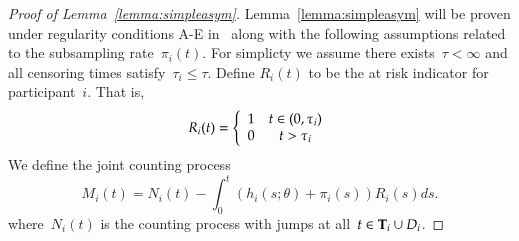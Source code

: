 \documentclass[11pt]{amsart}
\def\bfT{{\bf T}}
\begin{document}
\begin{proof}[Proof of Lemma~\ref{lemma:simpleasym}]
Lemma~\ref{lemma:simpleasym} will be proven under regularity
conditions A-E in~\cite[pp. 420--421]{Andersen1993} along with the
following assumptions related to the subsampling rate~$\pi_i (t)$.
For simplicty we assume there exists~$\tau < \infty$ and all censoring
times satisfy~$\tau_i \leq \tau$. Define $R_i (t)$ to be the at risk
indicator for participant~$i$.  That is, 
\[
R_i (t) = \left \{ \begin{array}{c c} 1 & t \in (0,\tau_i) \\ 0
                                        & t > \tau_i\end{array} \right .
\]
We define the joint counting process
\[
M_i (t) = N_i (t) - \int_0^t (h_i (s; \theta) + \pi_i (s)) R_i (s) ds. 
\]
where~$N_i (t)$ is the counting process with jumps at all~$t \in
\bfT_i \cup D_i$.


\end{proof}
\end{document}
